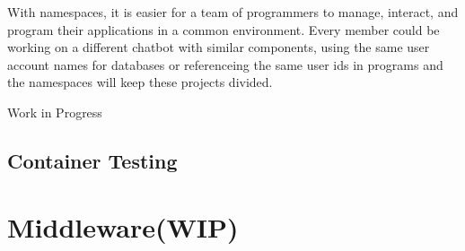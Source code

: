 \documentclass{article}
\begin{document}
With namespaces, it is easier for a team of programmers to manage, interact, and program their applications in a common environment. Every member could be working on a different chatbot with similar components, using the same user account names for databases or referenceing the same user ids in programs and the namespaces will keep these projects divided.

\noindent\makebox[\textwidth]{\rule{\textwidth}{7pt}} Work in Progress
\subsection{Container Testing}


\section{Middleware(WIP)}

%
\end{document}
